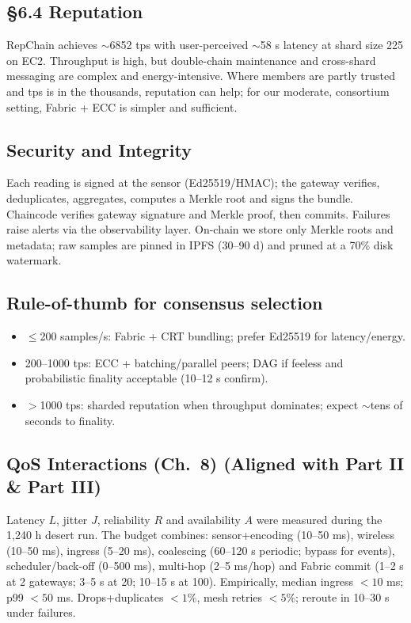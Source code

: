 \documentclass[12pt,onecolumn]{IEEEtran} %
\begin{document}
\subsection{\S6.4 Reputation}
RepChain achieves \(\sim\)6852 tps with user-perceived \(\sim\)58 s latency at shard size 225 on EC2. Throughput is high, but double-chain maintenance and cross-shard messaging are complex and energy-intensive. Where members are partly trusted and tps is in the thousands, reputation can help; for our moderate, consortium setting, Fabric + ECC is simpler and sufficient.

\subsection{Security and Integrity}
Each reading is signed at the sensor (Ed25519/HMAC); the gateway verifies, deduplicates, aggregates, computes a Merkle root and signs the bundle. Chaincode verifies gateway signature and Merkle proof, then commits. Failures raise alerts via the observability layer. On-chain we store only Merkle roots and metadata; raw samples are pinned in IPFS (30–90 d) and pruned at a 70\% disk watermark.

\subsection{Rule-of-thumb for consensus selection}
\begin{itemize}
  \item \(\le\)200 samples/s: Fabric + CRT bundling; prefer Ed25519 for latency/energy.
  \item 200–1000 tps: ECC + batching/parallel peers; DAG if feeless and probabilistic finality acceptable (10–12 s confirm).
  \item \(>\)1000 tps: sharded reputation when throughput dominates; expect \(\sim\)tens of seconds to finality.
\end{itemize}

\subsection{QoS Interactions (Ch.~8) (Aligned with Part II \& Part III)}
\label{subsec:qos-interactions}
Latency \(L\), jitter \(J\), reliability \(R\) and availability \(A\) were measured during the 1{,}240 h desert run. The budget combines: sensor+encoding (10–50 ms), wireless (10–50 ms), ingress (5–20 ms), coalescing (60–120 s periodic; bypass for events), scheduler/back-off (0–500 ms), multi-hop (2–5 ms/hop) and Fabric commit (1–2 s at 2 gateways; 3–5 s at 20; 10–15 s at 100). Empirically, median ingress \(<10\) ms; p99 \(<50\) ms. Drops+duplicates \(<1\%\), mesh retries \(<5\%\); reroute in 10–30 s under failures.
\end{document}

